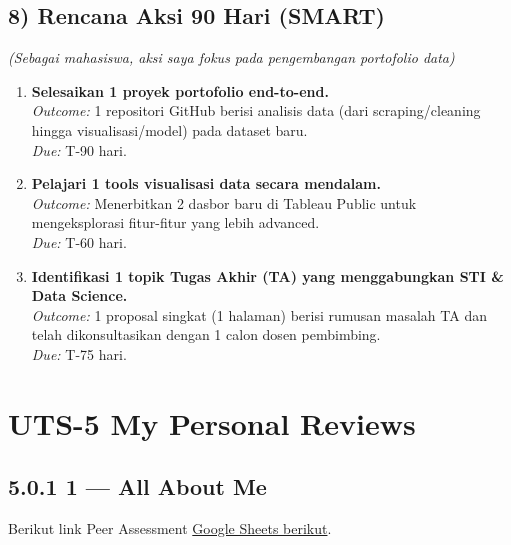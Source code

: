 \documentclass[
  letterpaper,
  DIV=11,
  numbers=noendperiod]{scrreprt}
\providecommand{\tightlist}{%
  \setlength{\itemsep}{0pt}\setlength{\parskip}{0pt}}
\begin{document}
\section{8) Rencana Aksi 90 Hari
(SMART)}\label{rencana-aksi-90-hari-smart}

\emph{(Sebagai mahasiswa, aksi saya fokus pada pengembangan portofolio
data)}

\begin{enumerate}
\def\labelenumi{\arabic{enumi}.}
\tightlist
\item
  \textbf{Selesaikan 1 proyek portofolio end-to-end.}\\
  \emph{Outcome:} 1 repositori GitHub berisi analisis data (dari
  scraping/cleaning hingga visualisasi/model) pada dataset baru.\\
  \emph{Due:} T-90 hari.
\item
  \textbf{Pelajari 1 tools visualisasi data secara mendalam.}\\
  \emph{Outcome:} Menerbitkan 2 dasbor baru di Tableau Public untuk
  mengeksplorasi fitur-fitur yang lebih advanced.\\
  \emph{Due:} T-60 hari.
\item
  \textbf{Identifikasi 1 topik Tugas Akhir (TA) yang menggabungkan STI
  \& Data Science.}\\
  \emph{Outcome:} 1 proposal singkat (1 halaman) berisi rumusan masalah
  TA dan telah dikonsultasikan dengan 1 calon dosen pembimbing.\\
  \emph{Due:} T-75 hari.
\end{enumerate}


\chapter{UTS-5 My Personal Reviews}\label{uts-5-my-personal-reviews}

\section{5.0.1 1 --- All About Me}\label{all-about-me}

Berikut link Peer Assessment
\href{https://docs.google.com/spreadsheets/d/16u6LQQzeI7odd5ikKwaKV-fqOmJmwD7Q/edit?usp=sharing&ouid=108543053307544988835&rtpof=true&sd=true}{Google
Sheets berikut}.
\end{document}
